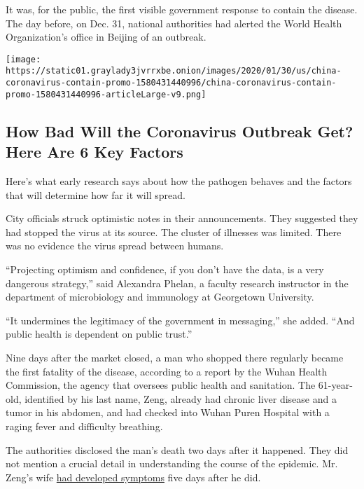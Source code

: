 It was, for the public, the first visible government response to contain
the disease. The day before, on Dec. 31, national authorities had
alerted the World Health Organization's office in Beijing of an
outbreak.

\href{https://www.nytimes3xbfgragh.onion/interactive/2020/world/asia/china-coronavirus-contain.html}{}

\texttt{[image: https://static01.graylady3jvrrxbe.onion/images/2020/01/30/us/china-coronavirus-contain-promo-1580431440996/china-coronavirus-contain-promo-1580431440996-articleLarge-v9.png]}

\hypertarget{how-bad-will-the-coronavirus-outbreak-get-here-are-6-key-factors}{%
\subsection{How Bad Will the Coronavirus Outbreak Get? Here Are 6 Key
Factors}\label{how-bad-will-the-coronavirus-outbreak-get-here-are-6-key-factors}}

Here's what early research says about how the pathogen behaves and the
factors that will determine how far it will spread.

City officials struck optimistic notes in their announcements. They
suggested they had stopped the virus at its source. The cluster of
illnesses was limited. There was no evidence the virus spread between
humans.

``Projecting optimism and confidence, if you don't have the data, is a
very dangerous strategy,'' said Alexandra Phelan, a faculty research
instructor in the department of microbiology and immunology at
Georgetown University.

``It undermines the legitimacy of the government in messaging,'' she
added. ``And public health is dependent on public trust.''

Nine days after the market closed, a man who shopped there regularly
became the first fatality of the disease, according to a report by the
Wuhan Health Commission, the agency that oversees public health and
sanitation. The 61-year-old, identified by his last name, Zeng, already
had chronic liver disease and a tumor in his abdomen, and had checked
into Wuhan Puren Hospital with a raging fever and difficulty breathing.

The authorities disclosed the man's death two days after it happened.
They did not mention a crucial detail in understanding the course of the
epidemic. Mr. Zeng's wife
\href{https://www.thelancet.com/journals/lancet/article/PIIS0140-6736(20)30183-5/fulltext}{had
developed symptoms} five days after he did.

